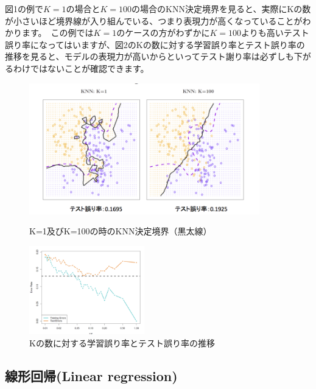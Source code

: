 \documentclass[uplatex]{jsarticle}
\begin{document}
図1の例で$K=1の場合とK=100$の場合のKNN決定境界を見ると、実際にKの数が小さいほど境界線が入り組んでいる、つまり表現力が高くなっていることがわかります。\
この例では$K=1$のケースの方がわずかに$K=100$よりも高いテスト誤り率になってはいますが、図2のKの数に対する学習誤り率とテスト誤り率の推移を見ると、モデルの表現力が高いからといってテスト謝り率は必ずしも下がるわけではないことが確認できます。\
\begin{figure}[htbp]
\begin{minipage}{0.7\hsize}
 \begin{center}
  \includegraphics[width=100mm]{img/knn_knum.png}
 \end{center}
 \caption{K=1及びK=100の時のKNN決定境界（黒太線）}
 \label{fig:one}
\end{minipage}
\begin{minipage}{0.3\hsize}
 \begin{center}
  \includegraphics[width=50mm]{img/knn_eror.png}
 \end{center}
 \caption{Kの数に対する学習誤り率とテスト誤り率の推移}
 \label{fig:two}
\end{minipage}
\end{figure}

\subsection{線形回帰(Linear regression)}
\end{document}
